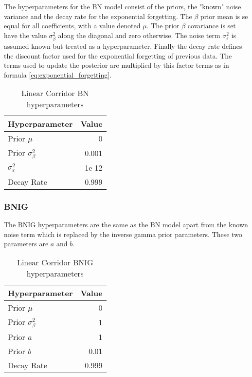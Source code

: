 {{The hyperparameters for the BN model consist of the priors, the "known" noise variance and the decay rate for the exponential forgetting. The $\beta$ prior mean is se equal for all coefficients, with a value denoted $\mu$. The prior $\beta$ covariance is set have the value $\sigma^2_\beta$ along the diagonal and zero otherwise. The noise term $\sigma^2_\varepsilon$ is assumed known but treated as a hyperparameter. Finally the decay rate defines the discount factor used for the exponential forgetting of previous data. The terms used to update the posterior are multiplied by this factor terms as in formula \ref{eq:exponential_forgetting}.

\begin{table}[H]
    \centering
    \begin{tabular}{@{}lr@{}}
        \toprule
        Hyperparameter               & Value \\ \midrule
        Prior $\mu$                  & 0     \\
        Prior $\sigma_\beta^2$       & 0.001 \\
        $\sigma^2_\varepsilon$       & 1e-12 \\
        Decay Rate                   & 0.999 \\ \bottomrule
        \end{tabular}
        \caption{Linear Corridor BN hyperparameters}

\end{table}

\subsubsection{BNIG}

The BNIG hyperparameters are the same as the BN model apart from the known noise term which is replaced by the inverse gamma prior parameters. These two parameters are $a$ and $b$.

\begin{table}[H]
    \centering
    \begin{tabular}{@{}lr@{}}
        \toprule
        Hyperparameter               & Value \\ \midrule
        Prior $\mu$                  & 0     \\
        Prior $\sigma_\beta^2$       & 1 \\
        Prior $a$                    & 1 \\
        Prior $b$                    & 0.01\\
        Decay Rate                   & 0.999 \\ \bottomrule
        \end{tabular}
        \caption{Linear Corridor BNIG hyperparameters}
\end{table}


}}
